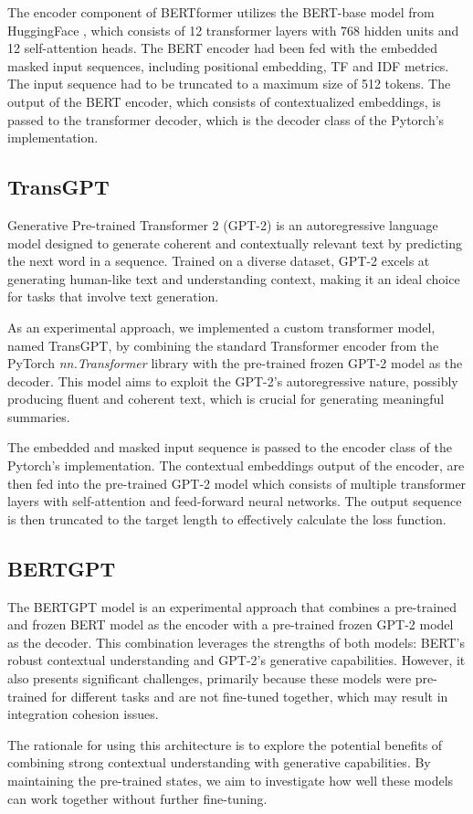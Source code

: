 The encoder component of BERTformer utilizes the BERT-base model from HuggingFace \cite{BERTHugginFace}, which consists of 12 transformer layers with 768 hidden units and 12 self-attention heads. The BERT encoder had been fed with the embedded masked input sequences, including positional embedding, TF and IDF metrics. The input sequence had to be truncated to a maximum size of 512 tokens. The output of the BERT encoder, which consists of contextualized embeddings, is passed to the transformer decoder, which is the decoder class of the Pytorch's implementation.

\subsection{TransGPT}
Generative Pre-trained Transformer 2 (GPT-2) \cite{radford2019language} is an autoregressive language model designed to generate coherent and contextually relevant text by predicting the next word in a sequence. Trained on a diverse dataset, GPT-2 excels at generating human-like text and understanding context, making it an ideal choice for tasks that involve text generation.

As an experimental approach, we implemented a custom transformer model, named TransGPT, by combining the standard Transformer encoder from the PyTorch \textit{nn.Transformer} library with the pre-trained frozen GPT-2 model as the decoder. This model aims to exploit the GPT-2's autoregressive nature, possibly producing fluent and coherent text, which is crucial for generating meaningful summaries.

The embedded and masked input sequence is passed to the encoder class of the Pytorch's implementation. The contextual embeddings output of the encoder, are then fed into the pre-trained GPT-2 model which consists of multiple transformer layers with self-attention and feed-forward neural networks. The output sequence is then truncated to the target length to effectively calculate the loss function.

\subsection{BERTGPT}
The BERTGPT model is an experimental approach that combines a pre-trained and frozen BERT model as the encoder with a pre-trained frozen GPT-2 model as the decoder. This combination leverages the strengths of both models: BERT's robust contextual understanding and GPT-2's generative capabilities. However, it also presents significant challenges, primarily because these models were pre-trained for different tasks and are not fine-tuned together, which may result in integration cohesion issues.

The rationale for using this architecture is to explore the potential benefits of combining strong contextual understanding with generative capabilities. By maintaining the pre-trained states, we aim to investigate how well these models can work together without further fine-tuning.

